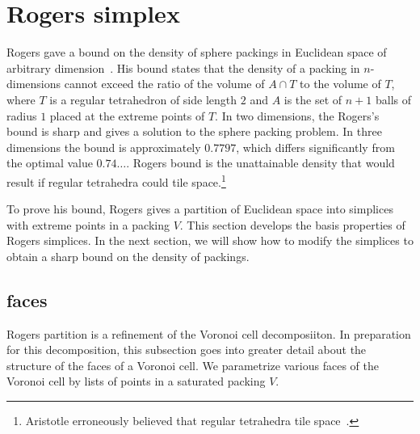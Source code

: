 \section{Rogers simplex}\label{sec:rogers}




Rogers gave a bound on the density of sphere packings in Euclidean
space of arbitrary dimension~\cite{Rogers:1958:Packing}.  His bound
states that the density of a packing in $n$-dimensions cannot exceed
the ratio of the volume of $A \cap T$ to the volume
of $T$, where $T$ is a regular tetrahedron of side length $2$ and $A$
is the set of $n+1$ balls of radius $1$ placed at the extreme points
of $T$.  In two dimensions, the Rogers's bound is sharp and gives a solution to
the sphere packing problem.  In three dimensions the bound is
approximately $0.7797$, which differs significantly from the optimal
value $0.74\ldots$.  Rogers bound is the unattainable density that
would result if regular tetrahedra could tile
space.\footnote{Aristotle erroneously believed that regular tetrahedra
  tile space~\cite{Aristotle}.}

To prove his bound, Rogers gives a partition of Euclidean space into
simplices with extreme points in a packing $V$.   This section develops
the basis properties of Rogers simplices.  In the next section, we
will show how to modify the simplices to obtain a sharp bound on the
density of packings.




\subsection{faces}

Rogers partition is a refinement of the Voronoi cell decomposiiton.
In preparation for this decomposition, this subsection goes into
greater detail about the structure of the faces of a Voronoi cell.  We
parametrize various faces of the Voronoi cell by lists of points in a
saturated packing $V$.

